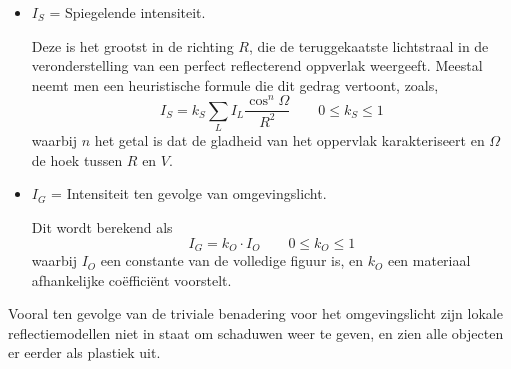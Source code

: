 \begin{enumerate}
{\begin{itemize}
\begin{itemize}
					Deze bijdrage veronderstelt een ideaal mat oppervlak, en is bijgevolg enkel afhankelijk van de invallende lichtintensiteit $I_L$, de afstand $R$ van het oogpunt tot het oppervlak, en de hoek $\theta$ tussen de invallende lichtstraal $L$ en de normaal $N$ op het oppervlak.

					$$I_D = k_D\sum_L I_L \frac{\cos \theta}{R^2} \qquad 0 \leq k_D \leq 1$$

				\item \textbf{$I_S$} = Spiegelende intensiteit.

					Deze is het grootst in de richting $R$, die de teruggekaatste lichtstraal in de veronderstelling van een perfect reflecterend oppverlak weergeeft. Meestal neemt men een heuristische formule die dit gedrag vertoont, zoals,
					$$I_S = k_S\sum_L I_L \frac{\cos^n \Omega}{R^2} \qquad 0 \leq k_S \leq 1$$ 
					waarbij $n$ het getal is dat de gladheid van het oppervlak karakteriseert en $\Omega$ de hoek tussen $R$ en $V$.

				\item \textbf{$I_G$} = Intensiteit ten gevolge van omgevingslicht. 
				
				Dit wordt berekend als $$I_G = k_O \cdot I_O  \qquad 0 \leq k_O \leq 1$$ waarbij $I_O$ een constante van de volledige figuur is, en $k_O$ een materiaal afhankelijke coëfficiënt voorstelt.
				


			\end{itemize}
			Vooral ten gevolge van de triviale benadering voor het omgevingslicht zijn lokale reflectiemodellen niet in staat om schaduwen weer te geven, en zien alle objecten er eerder als plastiek uit.
		\end{itemize}
		}
	

\end{enumerate}
